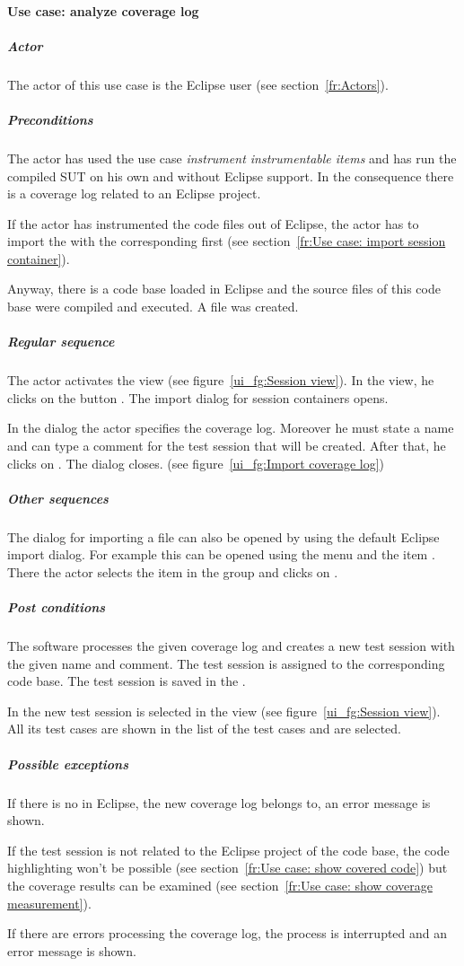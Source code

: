 \paragraph{Use case: analyze coverage log} \label{fr:Use case: analyze coverage log}
\subparagraph{Actor}
The actor of this use case is the Eclipse user (see section~\ref{fr:Actors}).
\subparagraph{Preconditions}
The actor has used the use case \textit{instrument instrumentable items} and has run the compiled SUT on his own and without Eclipse support. In the consequence there is a coverage log related to an Eclipse project.
\par
If the actor has instrumented the code files out of Eclipse, the actor has to import the  with the corresponding  first (see section~\ref{fr:Use case: import session container}).
\par
Anyway, there is a code base loaded in Eclipse and the source files of this code base were compiled and executed. A  file was created.
\subparagraph{Regular sequence}
The actor activates the  view (see figure~\ref{ui_fg:Session view}). In the view, he clicks on the button . The import dialog for session containers opens.
\par
In the dialog the actor specifies the coverage log. Moreover he must state a name and can type a comment for the test session that will be created. After that, he clicks on . The dialog closes. (see figure~\ref{ui_fg:Import coverage log})
\subparagraph{Other sequences}
The dialog for importing a  file can also be opened by using the default Eclipse import dialog. For example this can be opened using the menu  and the item . There the actor selects the item  in the group  and clicks on .
\subparagraph{Post conditions}
The software processes the given coverage log and creates a new test session with the given name and comment. The test session is assigned to the corresponding code base. The test session is saved in the .
\par
In the new test session is selected in the  view (see figure~\ref{ui_fg:Session view}). All its test cases are shown in the list of the test cases and are selected.
\subparagraph{Possible exceptions}
If there is no  in Eclipse, the new coverage log belongs to, an error message is shown.
\par
If the test session is not related to the Eclipse project of the code base, the code highlighting won't be possible (see section~\ref{fr:Use case: show covered code}) but the coverage results can be examined (see section~\ref{fr:Use case: show coverage measurement}).
\par
If there are errors processing the coverage log, the process is interrupted and an error message is shown.

